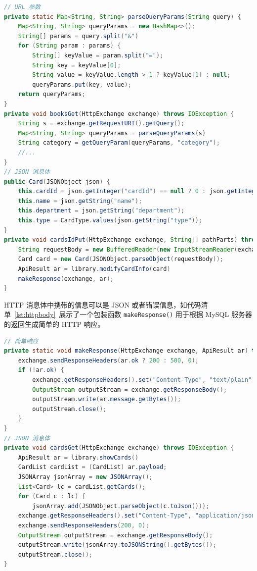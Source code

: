 \documentclass[a4paper,oneside]{ctexbook}
\begin{document}
\begin{lstlisting}[language=java, caption=请求解析,label=lst:parse]
// URL 参数
private static Map<String, String> parseQueryParams(String query) {
    Map<String, String> queryParams = new HashMap<>();
    String[] params = query.split("&")
    for (String param : params) {
        String[] keyValue = param.split("=");
        String key = keyValue[0];
        String value = keyValue.length > 1 ? keyValue[1] : null;
        queryParams.put(key, value);
    return queryParams;
}
private void booksGet(HttpExchange exchange) throws IOException {
    String s = exchange.getRequestURI().getQuery();
    Map<String, String> queryParams = parseQueryParams(s)
    String category = getQueryParam(queryParams, "category");
    //...
}
// JSON 消息体
public Card(JSONObject json) {
    this.cardId = json.getInteger("cardId") == null ? 0 : json.getInteger("cardId");
    this.name = json.getString("name");
    this.department = json.getString("department");
    this.type = CardType.values(json.getString("type"));
}
private void cardsIdPut(HttpExchange exchange, String[] pathParts) throws IOException {
    String requestBody = new BufferedReader(new InputStreamReader(exchange.getRequestBody())).lines().collect(Collectors.joining("\n"));
    Card card = new Card(JSONObject.parseObject(requestBody));
    ApiResult ar = library.modifyCardInfo(card)
    makeResponse(exchange, ar);
}
\end{lstlisting}

HTTP 消息体中携带的信息可以是 JSON 或者错误信息，如代码清单~\ref{lst:httpbody}~展示了一个包装函数 \verb|makeResponse()| 用于根据 MySQL 服务器的返回生成简单的 HTTP 响应。

\begin{lstlisting}[language=java, caption=消息体,label=lst:httpbody]
// 简单响应
private static void makeResponse(HttpExchange exchange, ApiResult ar) throws IOException {
    exchange.sendResponseHeaders(ar.ok ? 200 : 500, 0);
    if (!ar.ok) {
        exchange.getResponseHeaders().set("Content-Type", "text/plain");
        OutputStream outputStream = exchange.getResponseBody();
        outputStream.write(ar.message.getBytes());
        outputStream.close();
    }
}
// JSON 消息体
private void cardsGet(HttpExchange exchange) throws IOException {
    ApiResult ar = library.showCards()
    CardList cardList = (CardList) ar.payload;
    JSONArray jsonArray = new JSONArray();
    List<Card> lc = cardList.getCards();
    for (Card c : lc) {
        jsonArray.add(JSONObject.parseObject(c.toJson()));
    exchange.getResponseHeaders().set("Content-Type", "application/json");
    exchange.sendResponseHeaders(200, 0);
    OutputStream outputStream = exchange.getResponseBody();
    outputStream.write(jsonArray.toJSONString().getBytes());
    outputStream.close();
}
\end{lstlisting}
\end{document}

